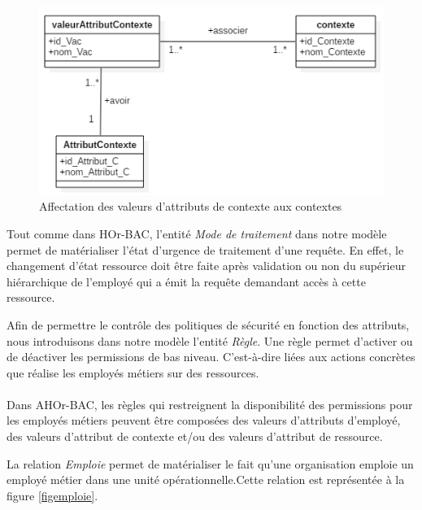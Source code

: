 \begin{figure}[h!]
    \centering
		\includegraphics[scale=0.7]{chap3/images/contexte_Attribut.png}
    \caption{Affectation des valeurs d'attributs de contexte aux contextes}
	 \label{figcontexte}
\end{figure} 

\label{sectionModeTraitement}

Tout comme dans HOr-BAC, l'entité \textit{Mode de traitement} dans notre modèle permet de matérialiser l'état d'urgence de traitement d'une requête. En effet, le changement d'état ressource doit être faite après validation ou non du supérieur hiérarchique de l'employé qui a émit la requête demandant accès à cette ressource.

\label{sectionRègle}

Afin de permettre le contrôle des politiques de sécurité en fonction des attributs, nous introduisons dans notre modèle l'entité \textit{Règle}. Une règle permet d'activer ou de déactiver les permissions de bas niveau. C'est-à-dire liées aux actions concrètes que réalise les employés métiers sur des ressources. 
\paragraph{} Dans AHOr-BAC, les règles qui restreignent la disponibilité des permissions pour les employés métiers peuvent être composées des valeurs d'attributs d'employé, des valeurs d'attribut de contexte et/ou des valeurs d'attribut de ressource.

\label{sectionRelation} 

\label{sectionEmployeUniteO}

La relation \textit{Emploie} permet de matérialiser le fait qu'une organisation emploie un employé métier dans une unité opérationnelle.Cette relation est représentée à la figure \ref{figemploie}.

